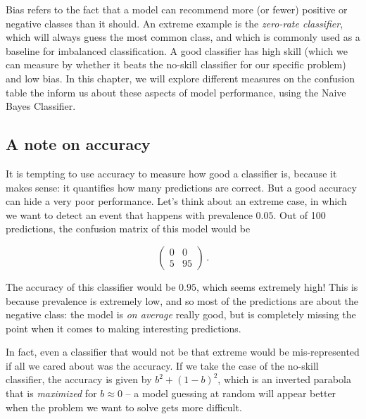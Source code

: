 \documentclass[
  letterpaper,
]{scrbook}
\begin{document}

Bias refers to the fact that a model can recommend more (or fewer)
positive or negative classes than it should. An extreme example is the
\emph{zero-rate classifier}, which will always guess the most common
class, and which is commonly used as a baseline for imbalanced
classification. A good classifier has high skill (which we can measure
by whether it beats the no-skill classifier for our specific problem)
and low bias. In this chapter, we will explore different measures on the
confusion table the inform us about these aspects of model performance,
using the Naive Bayes Classifier.

\subsection{A note on accuracy}\label{sec-classification-accuracy}

It is tempting to use accuracy to measure how good a classifier is,
because it makes sense: it quantifies how many predictions are correct.
But a good accuracy can hide a very poor performance. Let's think about
an extreme case, in which we want to detect an event that happens with
prevalence \(0.05\). Out of 100 predictions, the confusion matrix of
this model would be

\[
\begin{pmatrix}
0 & 0 \\ 5 & 95
\end{pmatrix} \,.
\]

The accuracy of this classifier would be \(0.95\), which seems extremely
high! This is because prevalence is extremely low, and so most of the
predictions are about the negative class: the model is \emph{on average}
really good, but is completely missing the point when it comes to making
interesting predictions.

In fact, even a classifier that would not be that extreme would be
mis-represented if all we cared about was the accuracy. If we take the
case of the no-skill classifier, the accuracy is given by
\(b^2 + (1-b)^2\), which is an inverted parabola that is
\emph{maximized} for \(b \approx 0\) -- a model guessing at random will
appear better when the problem we want to solve gets more difficult.
\end{document}
